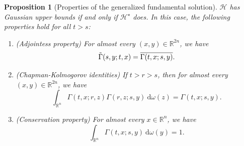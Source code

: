\documentclass[12pt, letterpaper]{amsart}
\newtheorem{prop}[thm]{Proposition}
\theoremstyle{definition}
\theoremstyle{remark}
\numberwithin{equation}{section}
\begin{document}
\begin{prop}[Properties of the generalized fundamental solution]\label{prop:solfundgeneralisée}
    $\mathcal{H}$ has Gaussian upper bounds if and only if $\mathcal{H}^\star$ does. In this case, the following properties hold for all $t>s$:
    \begin{enumerate}
        \item (Adjointess property) For almost every $(x,y) \in \mathbb{R}^{2n}$, we have
$$ \Tilde{\Gamma}(s,y;t,x) = \overline{\Gamma(t,x;s,y)}. $$
        \item (Chapman-Kolmogorov identities) If $t>r>s$, then for almost every $(x,y)\in \mathbb{R}^{2n}$, we have
        $$ \int_{\mathbb{R}^n} \Gamma(t,x;r,z) \Gamma(r,z;s,y) \ \mathrm{d}\omega(z)= \Gamma(t,x;s,y). $$
        \item (Conservation property) For almost every $x\in \mathbb{R}^n$, we have $$ \int_{\mathbb{R}^n} \Gamma(t,x;s,y) \ \mathrm{d}\omega(y)=1. $$
    \end{enumerate}
\end{prop}
\end{document}
